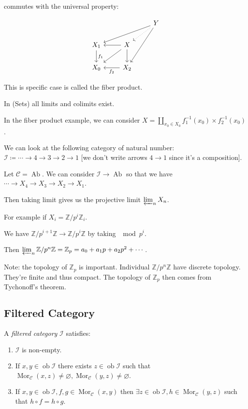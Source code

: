 \documentclass{article}
\theoremstyle{definition}
\begin{document}
    commutes with the universal property:

    \[
        \begin{tikzcd}
            & & Y \ar[dll] \ar[ddl] \ar[dl, dotted] \\ X_1 \ar[d, "f_1"] & X \ar[l] \ar[ld] \ar[d] \\ X_0 & X_2\ar[l, "f_2"]
        \end{tikzcd}
    \]

    This is specific case is called the fiber product.

    In (Sets) all limits and colimits exist.

    In the fiber product example, we can consider \(X = \coprod_{x_0\in X_0} f_1 ^{-1} (x_0) \times f_2 ^{-1} (x_0)\).

    We can look at the following category of natural number: \(\mathcal{I} \coloneqq \cdots \to 4 \to 3 \to 2 \to 1\) [we don't write arrows \(4 \to 1\) since it's a composition].

    Let \(\mathcal{C} = \operatorname{Ab}\). We can consider \(\mathcal{I} \to \operatorname{Ab}\) so that we have \(\cdots \to X_4 \to X_3 \to X_2 \to X_1\).
    
    Then taking limit gives us the projective limit \(\varprojlim_n X_n\).

    For example if \(X_i = \mathbb{Z} / p^i \mathbb{Z}_i\).

    We have \(\mathbb{Z} / p^{i+1} \mathbb{Z} \to \mathbb{Z} / p^i \mathbb{Z}\) by taking \(\mod p^i\). 

    Then \(\varprojlim_n \mathbb{Z} / p^n\mathbb{Z} = \mathbb{Z}_p = a_0 + a_1 p + a_2 p^2 + \cdots\).

    Note: the topology of \(\mathbb{Z}_p\) is important. Individual \(\mathbb{Z} /p^n \mathbb{Z}\) have discrete topology. They're finite and thus compact. The topology of \(\mathbb{Z}_p\) then comes from Tychonoff's theorem.

    \subsection*{Filtered Category}

    A \textit{filtered category} \(\mathcal{I}\) satisfies:

    \begin{enumerate}[label=\arabic*)]
        \item \(\mathcal{I}\) is non-empty.
        \item If \(x,y\in \operatorname{ob} \mathcal{I}\) there exists \(z\in \operatorname{ob} \mathcal{I}\) such that \(\operatorname{Mor}_{\mathcal{C}} (x,z)\neq \varnothing, \operatorname{Mor}_{\mathcal{C}} (y,z)\neq \varnothing\).
        \item If \(x,y\in \operatorname{ob} \mathcal{I}, f,g\in \operatorname{Mor}_{\mathcal{C}} (x,y)\) then \(\exists z\in \operatorname{ob} \mathcal{I}, h\in \operatorname{Mor}_{\mathcal{C}}(y,z)\) such that \(h \circ f = h \circ g\).   
    \end{enumerate} 
\end{document}
